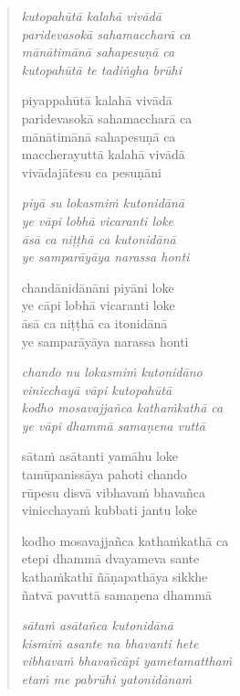 

\cleartoverso

\vspace*{30mm}

\begin{verse}

\emph{kutopahūtā kalahā vivādā\\
paridevasokā sahamaccharā ca}\\
\emph{mānātimānā sahapesuṇā ca\\
kutopahūtā te tadiṅgha brūhi}

piyappahūtā kalahā vivādā\\
paridevasokā sahamaccharā ca\\
mānātimānā sahapesuṇā ca\\
maccherayuttā kalahā vivādā\\
vivādajātesu ca pesuṇāni

\emph{piyā su lokasmiṁ kutonidānā\\
ye vāpi lobhā vicaranti loke}\\
\emph{āsā ca niṭṭhā ca kutonidānā\\
ye samparāyāya narassa honti}

chandānidānāni piyāni loke\\
ye cāpi lobhā vicaranti loke\\
āsā ca niṭṭhā ca itonidānā\\
ye samparāyāya narassa honti

\emph{chando nu lokasmiṁ kutonidāno\\
vinicchayā vāpi kutopahūtā}\\
\emph{kodho mosavajjañca kathaṁkathā ca\\
ye vāpi dhammā samaṇena vuttā}

sātaṁ asātanti yamāhu loke\\
tamūpanissāya pahoti chando\\
rūpesu disvā vibhavaṁ bhavañca\\
vinicchayaṁ kubbati jantu loke

kodho mosavajjañca kathaṁkathā ca\\
etepi dhammā dvayameva sante\\
kathaṁkathī ñāṇapathāya sikkhe\\
ñatvā pavuttā samaṇena dhammā

\emph{sātaṁ asātañca kutonidānā\\
kismiṁ asante na bhavanti hete}\\
\emph{vibhavaṁ bhavañcāpi yametamatthaṁ\\
etaṁ me pabrūhi yatonidānaṁ}


\end{verse}
